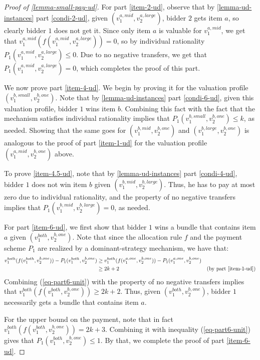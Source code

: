 \begin{proof}[Proof of \cref{lemma-small-pay-ud}]
For part \ref{item-2-ud}, observe that by  \cref{lemma-ud-instances} part \ref{condi-2-ud}, given $(v_1^{a,mid},v_2^{a,large})$, bidder $2$ gets item $a$, so clearly bidder $1$ does not get it. Since only item $a$ is valuable for $v_1^{a,mid}$, we get that $v_1^{a,mid}(f(v_1^{a,mid},v_2^{a,large}))\allowbreak=0$, so by individual rationality $P_1(v_1^{a,mid},v_2^{a,large})\le 0$. Due to no negative transfers, we get that $P_1(v_1^{a,mid},v_2^{a,large})=0$, which completes the proof of this part. 

We now prove part \ref{item-4-ud}. We begin by proving it for the valuation profile $(v_1^{b,small},v_2^{b,one})$. Note that by \cref{lemma-ud-instances} part \ref{condi-6-ud}, given this valuation profile, bidder $1$ wins item $b$. Combining this fact with the fact that the mechanism satisfies individual rationality implies that $P_1(v_1^{b,small},v_2^{b,one})\le k$, as needed. Showing that the same goes for $(v_1^{b,mid},v_2^{b,one})$ and $(v_1^{b,large},v_2^{b,one})$ is analogous to the proof of part \ref{item-1-ud} for the valuation profile $(v_1^{a,mid},v_2^{b,one})$ above.

To prove \ref{item-4.5-ud}, note that by \cref{lemma-ud-instances} part \ref{condi-4-ud}, bidder $1$ does not win item $b$ given $(v_1^{b,mid},v_2^{b,large})$. Thus, he has to pay at most zero due to individual rationality, and the property of no negative transfers implies that $P_1(v_1^{b,mid},v_2^{b,large})=0$, as needed.  

For part \ref{item-6-ud}, we first show that bidder $1$ wins a bundle that contains item $a$ given $(v_1^{both},v_2^{b,one})$. Note that since the allocation rule $f$ and the payment scheme $P_1$ are realized by a dominant-strategy mechanism, we have that:
\begin{equation}\label{eq-part6-unit}
\begin{aligned}
    v_1^{both}(f(v_1^{both},v_2^{b,one}))-P_1(v_1^{both},v_2^{b,one})&\ge v_1^{both}(f(v_1^{a,one},v_2^{b,one}))-P_1(v_1^{a,one},v_2^{b,one}) \\
    &\ge 2k+2 &\text{(by part \ref{item-1-ud})}
\end{aligned}    
\end{equation}
Combining (\ref{eq-part6-unit}) with the property of no negative transfers implies that $v_1^{both}(f(v_1^{both},v_2^{b,one}))\ge 2k+2$. Thus, given $(v_1^{both},v_2^{b,one})$, bidder $1$ necessarily gets a bundle that contains item $a$. 


For the upper bound on the payment, note that in fact $v_1^{both}(f(v_1^{both},v_2^{b,one}))=2k+3$.  
Combining it with inequality (\ref{eq-part6-unit}) gives that $P_1(v_1^{both},v_2^{b,one})\le 1$. By that, we  complete the proof of part \ref{item-6-ud}. 


\end{proof}
